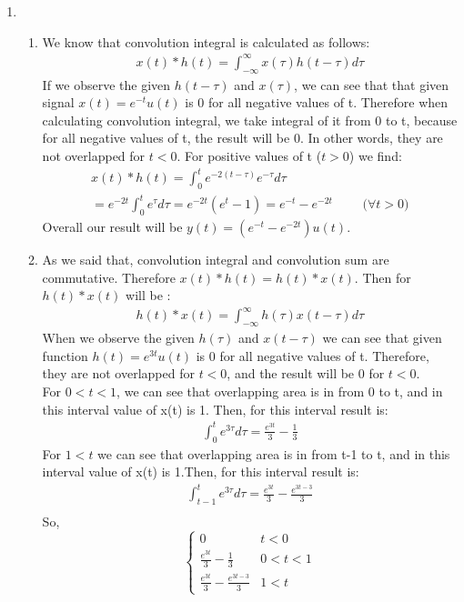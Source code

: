 \documentclass[10pt,a4paper, margin=1in]{article}
\begin{document}
\begin{enumerate}
\item %
    \begin{enumerate}
    \item %
    We know that convolution integral is calculated as follows:
    \begin{gather*}
        x(t)\ast h(t) = \int_{-\infty}^\infty x(\tau)h(t-\tau)d\tau
    \end{gather*}
    If we observe the given $h(t-\tau)$ and $x(\tau)$, we can see that that given signal $x(t)=e^{-t}u(t)$ is 0 for all negative values of t. Therefore when calculating convolution integral, we take integral of it from 0 to t, because for all negative values of t, the result will be 0. In other words, they are not overlapped for $t<0$. For positive values of t ($t>0$) we find: 
    \begin{gather*}
        x(t)*h(t) = \int_0^t e^{-2(t-\tau)}e^{-\tau}d\tau \\
        = e^{-2t} \int_{0}^t e^\tau d\tau = e^{-2t}(e^t-1)=e^{-t}-e^{-2t} \text{$\qquad$ ($\forall t > 0$)}
    \end{gather*}
    Overall our result will be $y(t)=(e^{-t}-e^{-2t})u(t)$.
    \item %
    As we said that, convolution integral and convolution sum are commutative. Therefore $x(t)*h(t)=h(t)*x(t)$. Then for $h(t)*x(t)$ will be : 
    \begin{gather*}
        h(t)\ast x(t) = \int_{-\infty}^\infty h(\tau)x(t-\tau)d\tau
    \end{gather*}
    When we observe the given $h(\tau)$ and $x(t-\tau)$ we can see that given function $h(t)=e^{3t}u(t)$ is 0 for all negative values of t. Therefore, they are not overlapped for $t<0$, and the result will be 0 for $t<0$. \\
    For $0<t<1$, we can see that overlapping area is in from 0 to t, and in this interval value of x(t) is 1. Then, for this interval result is: 
    \begin{gather*}
        \int_0^t e^{3\tau}d\tau = \frac{e^{3t}}{3}-\frac{1}{3}
    \end{gather*}
    For $1<t$ we can see that overlapping area is in from t-1 to t, and in this interval value of x(t) is 1.Then, for this interval result is:
    \begin{gather*}
        \int_{t-1}^t e^{3\tau}d\tau= \frac{e^{3t}}{3}-\frac{e^{3t-3}}{3}\\
    \end{gather*}
    So,
        \[ \begin{cases}
      0 & t< 0 \\
      \frac{e^{3t}}{3}-\frac{1}{3} & 0<t<1 \\
      \frac{e^{3t}}{3}-\frac{e^{3t-3}}{3} &  1<t 


\end{cases}\]
\end{enumerate}
\end{enumerate}
\end{document}
